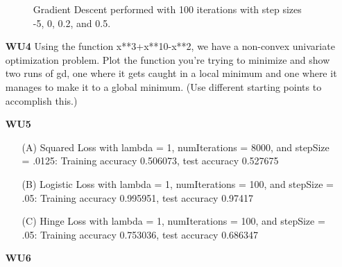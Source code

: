 \documentclass{article}
\begin{document}
\begin{enumerate}
\begin{figure}[htp]
\caption{Gradient Descent performed with 100 iterations with step sizes -5, 0, 0.2, and 0.5.}
\label{fig:WU2}

\end{figure}

	\item[\textbf{WU4}] 
Using the function x**3+x**10-x**2, we have a non-convex univariate optimization problem. Plot the function you're trying to minimize and show two runs of gd, one where it gets caught in a local minimum and one where it manages to make it to a global minimum. (Use different starting points to accomplish this.)		


	\item[\textbf{WU5}] 
	
	\begin{enumerate}
		\item[(A)] Squared Loss with lambda = 1, numIterations = 8000, and stepSize = .0125: Training accuracy 0.506073, test accuracy 0.527675
		\item[(B)] Logistic Loss with lambda = 1, numIterations = 100, and stepSize = .05: Training accuracy 0.995951, test accuracy 0.97417
		\item[(C)] Hinge Loss with lambda = 1, numIterations = 100, and stepSize = .05: Training accuracy 0.753036, test accuracy 0.686347
		
	\end{enumerate}
	
		
	\item[\textbf{WU6}]
	
	\end{enumerate}
	
	
\end{document}
